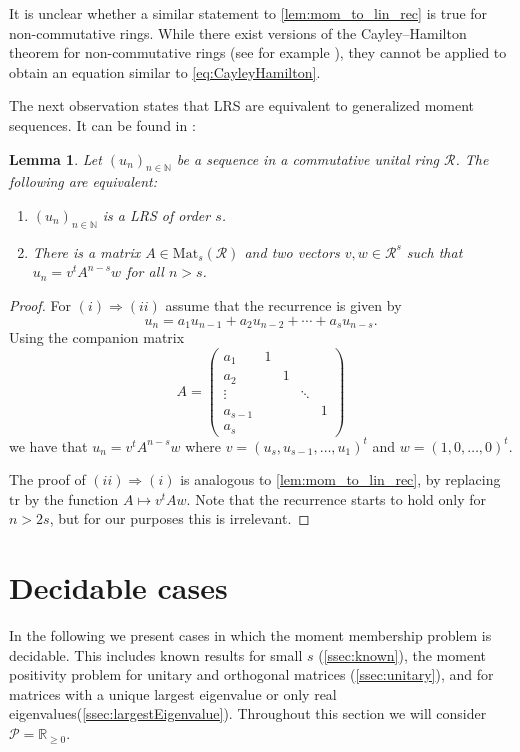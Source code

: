 \documentclass[11pt]{article}
\newtheorem{lemma}[theorem]{Lemma}
\theoremstyle{definition}
\newcommand{\Mat}{\mathrm{Mat}}
\newcommand{\tr}{\mathrm{tr}}
\begin{document}
It is unclear whether a similar statement to \cref{lem:mom_to_lin_rec} is true for non-commutative rings. While there exist versions of the Cayley--Hamilton theorem for non-commutative rings (see for example \cite{Gr11, Sz06}), they cannot be applied to obtain an equation similar to \eqref{eq:CayleyHamilton}.

The next observation states that LRS are equivalent to generalized moment sequences. It can be found in  \cite{OW}:

\begin{lemma}\label{prop:lin_rec_equ_moment}
Let $(u_n)_{n \in \mathbb{N}}$ be a sequence in a commutative unital ring $\mathcal{R}$. The following are equivalent:
\begin{enumerate}
	\item[$(i)$] $(u_n)_{n \in \mathbb{N}}$ is a LRS of order $s$.
	\item[$(ii)$] There is a matrix $A \in \Mat_s(\mathcal{R})$ and two vectors $v,w \in \mathcal{R}^s$ such that $u_n = v^t A^{n-s} w$ for all  $n>s$.
\end{enumerate}
\end{lemma}
\begin{proof}
For $(i) \Rightarrow (ii)$ assume that the recurrence  is given by
$$u_n = a_1 u_{n-1} + a_2 u_{n-2} + \cdots + a_s u_{n-s}.$$ 
Using the companion matrix
$$A = \begin{pmatrix} a_1 & 1 & & &  \\ a_2 & & 1 & & \\  \vdots & & & \ddots & \\ a_{s-1} & & & & 1 \\ a_s & & & & \end{pmatrix} $$
we have that $u_{n} = v^t A^{n-s} w$ where
$ v = (u_s, u_{s-1}, \ldots, u_1)^t$  and $w = (1, 0, \ldots, 0)^t.$

The proof of $(ii) \Rightarrow (i)$ is analogous to \cref{lem:mom_to_lin_rec}, by replacing $\tr$ by the function $A \mapsto v^t A w$. Note that the recurrence starts to hold only for $n>2s$, but for our purposes this is irrelevant.\end{proof}



\section{Decidable cases}
\label{sec:decidable}


In the following we present cases in which the moment membership problem is decidable. This includes known results for small $s$ (\cref{ssec:known}), the moment positivity problem for unitary and orthogonal matrices (\cref{ssec:unitary}), and for matrices with a unique largest eigenvalue or only real eigenvalues(\cref{ssec:largestEigenvalue}). Throughout this section we will consider $\mathcal P=\mathbb R_{\geqslant 0}$.
\end{document}

